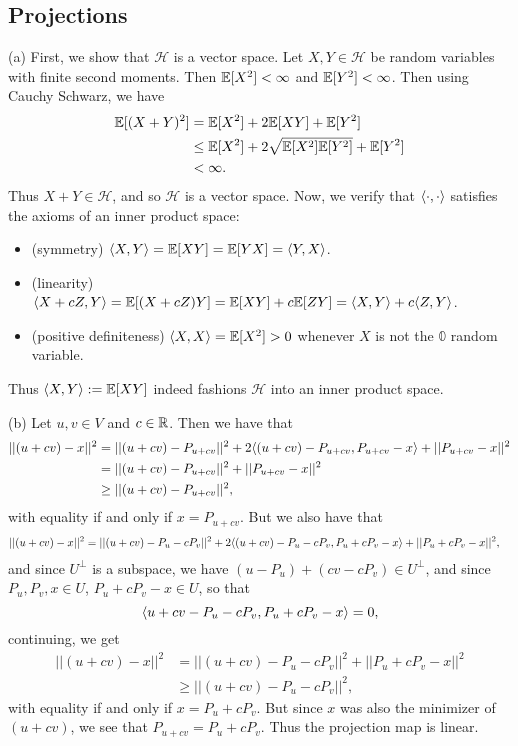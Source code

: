 \newcommand{\Hi}{\mathcal{H}}
\subsection{Projections}
(a) First, we show that $\Hi$ is a vector space. Let $X, Y \in \Hi$ be random variables with finite second moments. Then $\mathbb{E}[X^2] < \infty$ and $\mathbb{E}[Y^2] < \infty$. Then using Cauchy Schwarz, we have
\begin{align*}
    \mathbb{E}[(X + Y)^2] &= \mathbb{E}[X^2] + 2\mathbb{E}[XY] + \mathbb{E}[Y^2] \\
        & \leq \mathbb{E}[X^2] + 2\sqrt{\mathbb{E}[X^2]\mathbb{E}[Y^2]} + \mathbb{E}[Y^2] \\
        &< \infty.
\end{align*}
Thus $X + Y \in \Hi$, and so $\Hi$ is a vector space. Now, we verify that $\langle\cdot,\cdot\rangle$ satisfies the axioms of an inner product space:
\begin{itemize}
    \item (symmetry) $\langle X, Y\rangle = \mathbb{E}[XY] = \mathbb{E}[YX] = \langle Y, X\rangle$.
    \item (linearity) $\langle X + cZ, Y\rangle = \mathbb{E}[(X + cZ)Y] = \mathbb{E}[XY] + c\mathbb{E}[ZY] = \langle X, Y\rangle + c\langle Z, Y\rangle$.
    \item (positive definiteness) $\langle X, X\rangle = \mathbb{E}[X^2] > 0$ whenever $X$ is not the $\mathbb{0}$ random variable.
\end{itemize}
Thus $\langle X, Y\rangle := \mathbb{E}[XY]$ indeed fashions $\Hi$ into an inner product space.

(b) Let $u, v \in V$ and $c \in \mathbb{R}$. Then we have that
\begin{align*}
    ||(u + cv) - x||^2 &= ||(u + cv) - P_{u + cv}||^2 + 2\langle(u + cv) - P_{u + cv}, P_{u + cv} - x\rangle + ||P_{u + cv} - x||^2 \\
    &= ||(u + cv) - P_{u + cv}||^2  + ||P_{u + cv} - x||^2 \\
    &\geq ||(u + cv) - P_{u + cv}||^2,
\end{align*} 
with equality if and only if $x = P_{u + cv}$. But we also have that
\begin{align*}
    ||(u + cv) - x||^2 &= ||(u + cv) - P_u - cP_{v}||^2 + 2\langle(u + cv) - P_u - cP_{v}, P_{u} + cP_{v} - x\rangle + ||P_{u} + cP_{v} - x||^2,
\end{align*}
and since $U^\perp$ is a subspace, we have $(u - P_u) + (cv - cP_v) \in U^\perp$, and since $P_u, P_v, x \in U$, $P_u + cP_v - x \in U$, so that
\[
\langle u + cv - P_u - cP_v, P_u + cP_v - x\rangle = 0,
\]
continuing, we get
\begin{align*}
    ||(u + cv) - x||^2 &= ||(u + cv) - P_u - cP_{v}||^2 + ||P_{u} + cP_{v} - x||^2 \\
        &\geq ||(u + cv) - P_u - cP_{v}||^2,
\end{align*}
with equality if and only if $x = P_u + cP_v$. But since $x$ was also the minimizer of $(u + cv)$, we see that $P_{u + cv} = P_u + cP_v$. Thus the projection map is linear.

